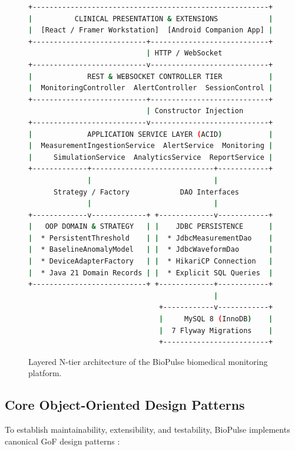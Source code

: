 \documentclass[10pt,journal,compsoc]{IEEEtran}
\begin{document}
\begin{figure}[!t]
\centering
\begin{lstlisting}[language=bash,numbers=none]
+--------------------------------------------------------+
|          CLINICAL PRESENTATION & EXTENSIONS            |
|  [React / Framer Workstation]  [Android Companion App] |
+---------------------------+----------------------------+
                            | HTTP / WebSocket
+---------------------------v----------------------------+
|             REST & WEBSOCKET CONTROLLER TIER           |
|  MonitoringController  AlertController  SessionControl |
+---------------------------+----------------------------+
                            | Constructor Injection
+---------------------------v----------------------------+
|             APPLICATION SERVICE LAYER (ACID)           |
|  MeasurementIngestionService  AlertService  Monitoring |
|     SimulationService  AnalyticsService  ReportService |
+-------------+-----------------------------+------------+
              |                             |
      Strategy / Factory            DAO Interfaces
              |                             |
+-------------v-------------+ +-------------v------------+
|   OOP DOMAIN & STRATEGY   | |    JDBC PERSISTENCE      |
|  * PersistentThreshold    | |  * JdbcMeasurementDao    |
|  * BaselineAnomalyModel   | |  * JdbcWaveformDao       |
|  * DeviceAdapterFactory   | |  * HikariCP Connection   |
|  * Java 21 Domain Records | |  * Explicit SQL Queries  |
+---------------------------+ +-------------+------------+
                                            |
                               +------------v------------+
                               |     MySQL 8 (InnoDB)    |
                               |  7 Flyway Migrations    |
                               +-------------------------+
\end{lstlisting}
\caption{Layered N-tier architecture of the BioPulse biomedical monitoring platform.}
\label{fig:architecture}
\end{figure}

\subsection{Core Object-Oriented Design Patterns}
To establish maintainability, extensibility, and testability, BioPulse implements canonical GoF design patterns \cite{gamma1994design}:
\end{document}
